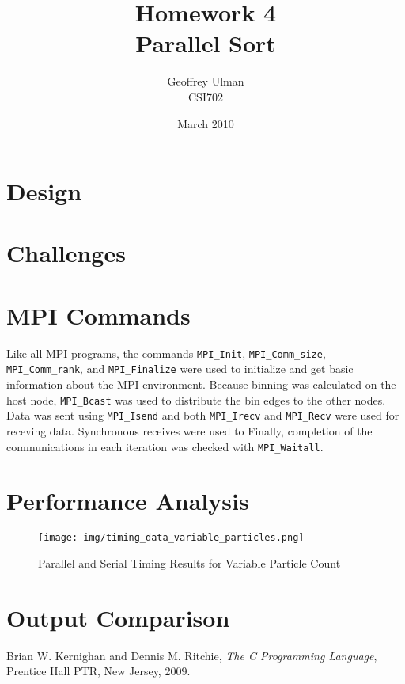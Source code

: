 \documentclass{article}
\begin{document}
\title{Homework 4\\
       Parallel Sort}
\author{Geoffrey Ulman\\
        CSI702}
\date{March 2010}
\maketitle

\section{Design}

\section{Challenges}

\section{MPI Commands}
Like all MPI programs, the commands \verb!MPI_Init!, \verb!MPI_Comm_size!, \verb!MPI_Comm_rank!, and \verb!MPI_Finalize! were used to initialize and get basic information about the MPI environment. Because binning was calculated on the host node, \verb!MPI_Bcast! was used to distribute the bin edges to the other nodes. Data was sent using \verb!MPI_Isend! and both \verb!MPI_Irecv! and \verb!MPI_Recv! were used for receving data. Synchronous receives were used to  Finally, completion of the communications in each iteration was checked with \verb!MPI_Waitall!.

\section{Performance Analysis}

\begin{figure}
\centering
\texttt{[image: img/timing\_data\_variable\_particles.png]}
\caption{Parallel and Serial Timing Results for Variable Particle Count}
\label{chart1}
\end{figure}


\section{Output Comparison}
\label{outputcomp}

\begin{thebibliography}{9}

  Brian W. Kernighan and Dennis M. Ritchie,
  \emph{The C Programming Language},
  Prentice Hall PTR, New Jersey,
  2009.

\end{thebibliography}
\end{document}

